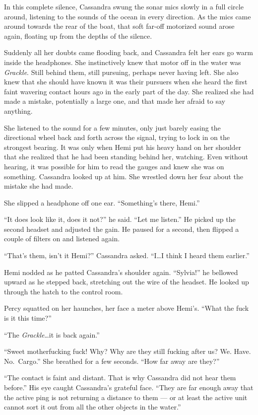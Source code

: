 \documentclass[
]{scrbook}
\begin{document}
In this complete silence, Cassandra swung the sonar mics slowly in a
full circle around, listening to the sounds of the ocean in every
direction. As the mics came around towards the rear of the boat, that
soft far-off motorized sound arose again, floating up from the depths of
the silence.

Suddenly all her doubts came flooding back, and Cassandra felt her ears
go warm inside the headphones. She instinctively knew that motor off in
the water was \emph{Grackle}. Still behind them, still pursuing, perhaps
never having left. She also knew that she should have known it was their
pursuers when she heard the first faint wavering contact hours ago in
the early part of the day. She realized she had made a mistake,
potentially a large one, and that made her afraid to say anything.

She listened to the sound for a few minutes, only just barely easing the
directional wheel back and forth across the signal, trying to lock in on
the strongest bearing. It was only when Hemi put his heavy hand on her
shoulder that she realized that he had been standing behind her,
watching. Even without hearing, it was possible for him to read the
gauges and knew she was on something. Cassandra looked up at him. She
wrestled down her fear about the mistake she had made.

She slipped a headphone off one ear. ``Something's there, Hemi.''

``It does look like it, does it not?'' he said. ``Let me listen.'' He
picked up the second headset and adjusted the gain. He paused for a
second, then flipped a couple of filters on and listened again.

``That's them, isn't it Hemi?'' Cassandra asked. ``I\ldots I think I
heard them earlier.''

Hemi nodded as he patted Cassandra's shoulder again. ``Sylvia!'' he
bellowed upward as he stepped back, stretching out the wire of the
headset. He looked up through the hatch to the control room.

Percy squatted on her haunches, her face a meter above Hemi's. ``What
the fuck is it this time?''

``The \emph{Grackle}\ldots it is back again.''

``Sweet motherfucking fuck! Why? Why are they still fucking after us?
We. Have. No.~Cargo.'' She breathed for a few seconds. ``How far away
are they?''

``The contact is faint and distant. That is why Cassandra did not hear
them before.'' His eye caught Cassandra's grateful face. ``They are far
enough away that the active ping is not returning a distance to them ---
or at least the active unit cannot sort it out from all the other
objects in the water.''
\end{document}
